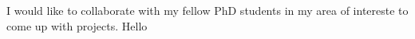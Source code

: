 I would like to collaborate with my fellow PhD students in my area of intereste to come up with projects.
Hello
